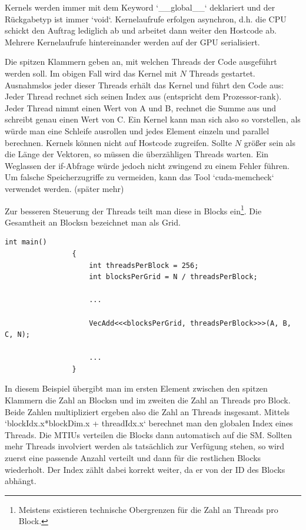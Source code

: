 			\Glspl{Kernel} werden immer mit dem Keyword \li`__global__` deklariert und der Rückgabetyp ist immer \li`void`. \Gls{Kernel}aufrufe erfolgen asynchron, d.h. die CPU schickt den Auftrag lediglich ab und arbeitet dann weiter den Hostcode ab. Mehrere \Gls{Kernel}aufrufe hintereinander werden auf der GPU serialisiert.
			
			Die spitzen Klammern geben an, mit welchen \Glspl{Thread} der Code ausgeführt werden soll. Im obigen Fall wird das \Gls{Kernel} mit $N$ \Glspl{Thread} gestartet. Ausnahmslos jeder dieser \Glspl{Thread} erhält das \Gls{Kernel} und führt den Code aus: Jeder \Gls{Thread} rechnet sich seinen Index aus (entspricht dem Prozessor-rank). Jeder \Gls{Thread} nimmt einen Wert von A und B, rechnet die Summe aus und schreibt genau einen Wert von C. Ein \Gls{Kernel} kann man sich also so vorstellen, als würde man eine Schleife ausrollen und jedes Element einzeln und parallel berechnen. \Glspl{Kernel} können nicht auf Hostcode zugreifen. Sollte $N$ größer sein als die Länge der Vektoren, so müssen die überzähligen \Glspl{Thread} warten. Ein Weglassen der if-Abfrage würde jedoch nicht zwingend zu einem Fehler führen. Um falsche Speicherzugriffe zu vermeiden, kann das Tool \li`cuda-memcheck` verwendet werden. (später mehr)
			
			Zur besseren Steuerung der \Glspl{Thread} teilt man diese in \Glspl{Block} ein\footnote{Meistens existieren technische Obergrenzen für die Zahl an Threads pro Block.}. Die Gesamtheit an \Glspl{Block}n bezeichnet man als \Gls{Grid}.
			
			\begin{lstlisting}[caption=Kernelaufruf]		
				int main()
				{
					int threadsPerBlock = 256;
					int blocksPerGrid = N / threadsPerBlock;
					
					...
					
					VecAdd<<<blocksPerGrid, threadsPerBlock>>>(A, B, C, N);
					
					...					
				}
			\end{lstlisting}

			In diesem Beispiel übergibt man im ersten Element zwischen den spitzen Klammern die Zahl an \Glspl{Block}n und im zweiten die Zahl an \Glspl{Thread} pro \Gls{Block}. Beide Zahlen multipliziert ergeben also die Zahl an \Glspl{Thread} insgesamt. Mittels \li`blockIdx.x*blockDim.x + threadIdx.x` berechnet man den globalen Index eines \Glspl{Thread}. Die \Glspl{MTIU} verteilen die \Glspl{Block} dann automatisch auf die \Gls{SM}. Sollten mehr \Glspl{Thread} involviert werden als tatsächlich zur Verfügung stehen, so wird zuerst eine passende Anzahl verteilt und dann für die restlichen \Glspl{Block} wiederholt. Der Index zählt dabei korrekt weiter, da er von der ID des \Gls{Block}s abhängt.
			

